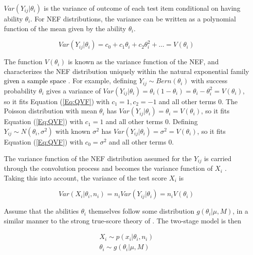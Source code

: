\documentclass[12pt,epsfig]{article}
\newcommand{\change}[1]{\textcolor{black}{#1}}
\begin{document}
\noindent $Var(Y_{ij} | \theta_i)$ is the variance of outcome of each test item conditional on having ability $\theta_i$. For NEF distributions, the variance can be written as a polynomial function of the mean given by the ability $\theta_i$. 

\begin{equation}
Var(Y_{ij} | \theta_i) = c_0 + c_1 \theta_i + c_2 \theta_i^2 + \ldots = V(\theta_i)
\label{Eq:QVF}
\end{equation}


The function $V(\theta_i)$ is known as the variance function of the NEF, and characterizes the NEF distribution uniquely within the natural exponential family \change{given a sample space} \citep{Morris1982}. For example, defining $Y_{ij} \sim Bern(\theta_i)$ with success probability $\theta_i$ gives a variance of $Var(Y_{ij} | \theta_i) = \theta_i (1-\theta_i) =  \theta_i - \theta_i^2 = V(\theta_i)$, so it fits Equation (\ref{Eq:QVF}) with $c_1 = 1, c_2 = -1$ and all other terms $0$. The Poisson distribution with mean $\theta_i$ has $Var(Y_{ij}|\theta_i) = \theta_i = V(\theta_i)$, so it fits Equation (\ref{Eq:QVF}) with $c_1 = 1$ and all other terms $0$. Defining $Y_{ij} \sim N(\theta_i, \sigma^2)$ with known $\sigma^2$ has $Var(Y_{ij} | \theta_i) = \sigma^2 = V(\theta_i)$, so it fits Equation (\ref{Eq:QVF}) with $c_0 = \sigma^2$ and all other terms $0$. 

The variance function of the NEF distribution assumed for the $Y_{ij}$ is carried through the convolution process and becomes the variance function of $X_i$ \citep{Morris1982}. Taking this into account, the variance of the test score $X_i$ is

\begin{equation*}
Var(X_i | \theta_i, n_i) = n_i Var(Y_{ij}| \theta_i) = n_i V(\theta_i)
\end{equation*}


Assume that the abilities $\theta_i$ themselves follow some distribution $g(\theta_i | \mu, M)$, in a similar manner to the strong true-score theory of \cite{Lord1965}. The two-stage model is then 

\begin{gather*}
X_i \sim p(x_i | \theta_i, n_i)\\
\theta_i \sim g(\theta_i | \mu, M)
\end{gather*}
\end{document}
